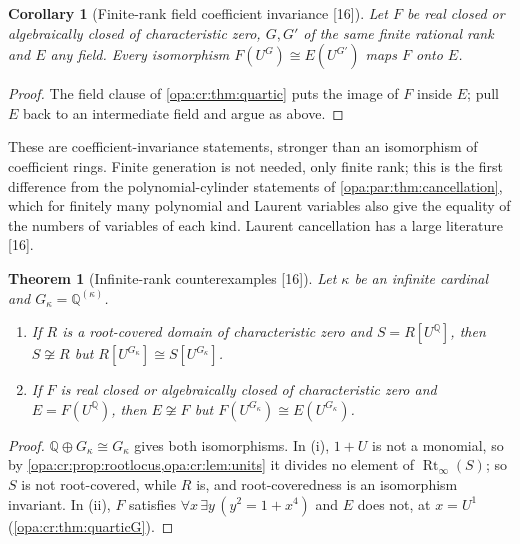 \documentclass[11pt,oneside]{article}
\numberwithin{equation}{section}
\newtheorem{theorem}{Theorem}[section]
\newtheorem{corollary}[corollary]{Corollary}
\theoremstyle{definition}
\theoremstyle{remark}
\newcommand{\Q}{\mathbb Q}
\newcommand{\src}[1]{\textup{\textsf{\small[#1]}}}
\begin{document}
\begin{corollary}[Finite-rank field coefficient invariance \src{16}]\label{opa:cr:cor:finitefield}
Let $F$ be real closed or algebraically closed of characteristic zero, $G,G'$ of the same finite rational rank and $E$
any field. Every isomorphism $F(U^G)\cong E(U^{G'})$ maps $F$ onto $E$.
\end{corollary}
\begin{proof}
The field clause of \cref{opa:cr:thm:quartic} puts the image of $F$ inside $E$; pull $E$ back to an intermediate field and
argue as above.
\end{proof}

These are coefficient-invariance statements, stronger than an isomorphism of coefficient rings. Finite generation is
not needed, only finite rank; this is the first difference from the polynomial-cylinder statements of
\cref{opa:par:thm:cancellation}, which for finitely many polynomial and Laurent variables also give the equality of the
numbers of variables of each kind. Laurent cancellation has a large literature \cite{Freudenburg} \src{16}.

\begin{theorem}[Infinite-rank counterexamples \src{16}]\label{opa:cr:thm:infinitefail}
Let $\kappa$ be an infinite cardinal and $G_\kappa=\Q^{(\kappa)}$.
\begin{enumerate}[label=\textup{(\roman*)},itemsep=1pt]
\item If $R$ is a root-covered domain of characteristic zero and $S=R[U^\Q]$, then $S\not\cong R$ but
$R[U^{G_\kappa}]\cong S[U^{G_\kappa}]$.
\item If $F$ is real closed or algebraically closed of characteristic zero and $E=F(U^\Q)$, then $E\not\cong F$ but
$F(U^{G_\kappa})\cong E(U^{G_\kappa})$.
\end{enumerate}
\end{theorem}
\begin{proof}
$\Q\oplus G_\kappa\cong G_\kappa$ gives both isomorphisms. In (i), $1+U$ is not a monomial, so by
\cref{opa:cr:prop:rootlocus,opa:cr:lem:units} it divides no element of $\operatorname{Rt}_\infty(S)$; so $S$ is not root-covered, while
$R$ is, and root-coveredness is an isomorphism invariant. In (ii), $F$ satisfies $\forall x\,\exists y\,(y^2=1+x^4)$ and $E$
does not, at $x=U^1$ (\cref{opa:cr:thm:quarticG}).
\end{proof}
\end{document}
